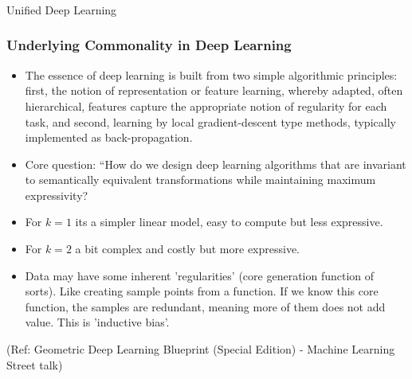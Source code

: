 \begin{frame}[fragile]\frametitle{}
\begin{center}
{\Large Unified Deep Learning}
\end{center}
\end{frame}

\begin{frame}[fragile]\frametitle{Underlying Commonality in Deep Learning}


\begin{itemize}
\item The essence of deep learning is built from two simple algorithmic principles: first, the notion of representation or feature learning, whereby adapted, often hierarchical, features capture the appropriate notion of regularity for each task, and second, learning by local gradient-descent type methods, typically implemented as back-propagation.
\item Core question: ``How do we design deep learning algorithms that are invariant to semantically equivalent transformations while maintaining maximum expressivity?
\item For $k=1$ its a simpler linear model, easy to compute but less expressive.
\item For $k=2$ a bit complex and costly but more expressive.
\item Data may have some inherent 'regularities' (core generation function of sorts). Like creating sample points from a function. If we know this core function, the samples are redundant, meaning more of them does not add value. This is 'inductive bias'.
\end{itemize}
	  
{\tiny (Ref: Geometric Deep Learning Blueprint (Special Edition) - Machine Learning Street talk)}

\end{frame}

